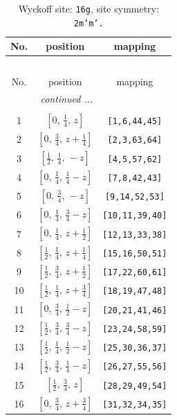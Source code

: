 \documentclass[fleqn,8pt]{jsarticle}
\begin{document}
\renewcommand{\arraystretch}{1.2}
\begin{longtable}{ccc}
\caption{Wyckoff site: {\tt 16g}, site symmetry: {\tt 2m'm'.}}
 \\
 \hline \hline
No. & position & mapping \\ \hline \endfirsthead

\multicolumn{2}{l}{\tablename\ \thetable{}} \\
 \hline \hline
No. & position & mapping \\ \hline \endhead

 \hline \hline
\multicolumn{2}{r}{\footnotesize\it continued ...} \\ \endfoot

 \hline \hline
\multicolumn{2}{r}{} \\ \endlastfoot

1 & $\left[ 0,\, \frac{1}{4},\, z \right]$ & {\tt [1,6,44,45]} \\ \hline
2 & $\left[ 0,\, \frac{3}{4},\, z + \frac{1}{4} \right]$ & {\tt [2,3,63,64]} \\ \hline
3 & $\left[ \frac{1}{2},\, \frac{1}{4},\, - z \right]$ & {\tt [4,5,57,62]} \\ \hline
4 & $\left[ 0,\, \frac{1}{4},\, \frac{1}{4} - z \right]$ & {\tt [7,8,42,43]} \\ \hline
5 & $\left[ 0,\, \frac{3}{4},\, - z \right]$ & {\tt [9,14,52,53]} \\ \hline
6 & $\left[ 0,\, \frac{1}{4},\, \frac{3}{4} - z \right]$ & {\tt [10,11,39,40]} \\ \hline
7 & $\left[ 0,\, \frac{1}{4},\, z + \frac{1}{2} \right]$ & {\tt [12,13,33,38]} \\ \hline
8 & $\left[ \frac{1}{2},\, \frac{1}{4},\, z + \frac{1}{4} \right]$ & {\tt [15,16,50,51]} \\ \hline
9 & $\left[ \frac{1}{2},\, \frac{3}{4},\, z + \frac{1}{2} \right]$ & {\tt [17,22,60,61]} \\ \hline
10 & $\left[ \frac{1}{2},\, \frac{1}{4},\, z + \frac{3}{4} \right]$ & {\tt [18,19,47,48]} \\ \hline
11 & $\left[ 0,\, \frac{3}{4},\, \frac{1}{2} - z \right]$ & {\tt [20,21,41,46]} \\ \hline
12 & $\left[ \frac{1}{2},\, \frac{3}{4},\, \frac{3}{4} - z \right]$ & {\tt [23,24,58,59]} \\ \hline
13 & $\left[ \frac{1}{2},\, \frac{1}{4},\, \frac{1}{2} - z \right]$ & {\tt [25,30,36,37]} \\ \hline
14 & $\left[ \frac{1}{2},\, \frac{3}{4},\, \frac{1}{4} - z \right]$ & {\tt [26,27,55,56]} \\ \hline
15 & $\left[ \frac{1}{2},\, \frac{3}{4},\, z \right]$ & {\tt [28,29,49,54]} \\ \hline
16 & $\left[ 0,\, \frac{3}{4},\, z + \frac{3}{4} \right]$ & {\tt [31,32,34,35]} \\
\end{longtable}
\end{document}
